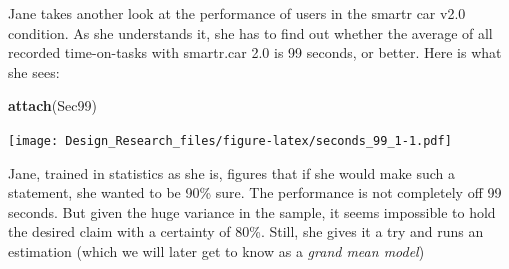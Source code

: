 \documentclass[]{svmono}
\newenvironment{Shaded}{\begin{snugshade}}{\end{snugshade}}
\newcommand{\KeywordTok}[1]{\textcolor[rgb]{0.13,0.29,0.53}{\textbf{#1}}}
\newcommand{\DataTypeTok}[1]{\textcolor[rgb]{0.13,0.29,0.53}{#1}}
\newcommand{\DecValTok}[1]{\textcolor[rgb]{0.00,0.00,0.81}{#1}}
\newcommand{\StringTok}[1]{\textcolor[rgb]{0.31,0.60,0.02}{#1}}
\newcommand{\OperatorTok}[1]{\textcolor[rgb]{0.81,0.36,0.00}{\textbf{#1}}}
\newcommand{\NormalTok}[1]{#1}
\theoremstyle{definition}
\theoremstyle{definition}
\theoremstyle{definition}
\theoremstyle{remark}
\begin{document}
Jane takes another look at the performance of users in the smartr car
v2.0 condition. As she understands it, she has to find out whether the
average of all recorded time-on-tasks with smartr.car 2.0 is 99 seconds,
or better. Here is what she sees:

\begin{Shaded}
\begin{Highlighting}[]
\KeywordTok{attach}\NormalTok{(Sec99)}
\end{Highlighting}
\end{Shaded}

\begin{Shaded}
\end{Shaded}

\texttt{[image: Design\_Research\_files/figure-latex/seconds\_99\_1-1.pdf]}

Jane, trained in statistics as she is, figures that if she would make
such a statement, she wanted to be 90\% sure. The performance is not
completely off 99 seconds. But given the huge variance in the sample, it
seems impossible to hold the desired claim with a certainty of 80\%.
Still, she gives it a try and runs an estimation (which we will later
get to know as a \emph{grand mean model})

\begin{Shaded}
\end{Shaded}
\end{document}
